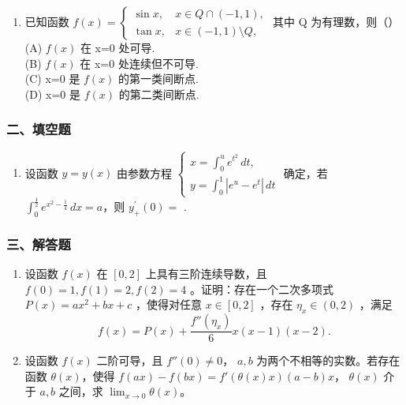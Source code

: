 \documentclass[12pt, a4paper]{ctexart}
\begin{document}
\begin{enumerate}
    \item 已知函数 $ f(x)=\begin{cases}\sin x, & x\in Q\cap(-1,1), \\ \tan x, & x\in(-1,1)\setminus Q,\end{cases} $ 其中 Q 为有理数，则（）\\
    (A) $ f(x) $ 在 x=0 处可导.\\
    (B) $ f(x) $ 在 x=0 处连续但不可导.\\
    (C) x=0 是 $ f(x) $ 的第一类间断点.\\
    (D) x=0 是 $ f(x) $ 的第二类间断点.
\end{enumerate}

\subsubsection*{二、填空题}

\begin{enumerate}[start=2]
    \item 设函数 $ y = y(x) $ 由参数方程 $ \begin{cases} x = \int_{0}^{u} e^{t^{2}} \, dt, \\ y = \int_{0}^{1} |e^{u} - e^{t}| \, dt \end{cases} $ 确定，若 $ \int_{0}^{\frac{1}{2}} e^{x^{2} - \frac{1}{4}} \, dx = a $，则 $ y_{+}^{'}(0) = $ \underline{\hspace{2cm}}.
\end{enumerate}

\subsubsection*{三、解答题}

\begin{enumerate}[start=3]
    \item 设函数 $ f(x) $ 在 $ [0,2] $ 上具有三阶连续导数，且 $ f(0)=1, f(1)=2, f(2)=4 $ 。证明：存在一个二次多项式 $ P(x)=ax^{2}+bx+c $ ，使得对任意 $ x \in [0,2] $ ，存在 $ \eta_{x} \in (0,2) $ ，满足
    $$ f(x)=P(x)+\frac{f''(\eta_{x})}{6}x(x-1)(x-2). $$

    \item 设函数 $ f(x) $ 二阶可导，且 $ f''(0) \neq 0 $， $ a, b $ 为两个不相等的实数。若存在函数 $ \theta(x) $，使得 $ f(ax) - f(bx) = f'(\theta(x)x)(a - b)x $， $ \theta(x) $ 介于 $ a, b $ 之间，求 $ \lim_{x \to 0} \theta(x) $。
\end{enumerate}
\end{document}
